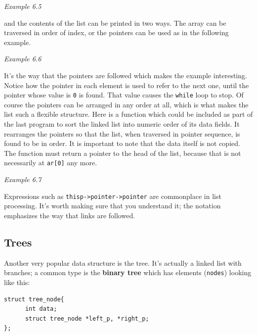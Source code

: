    \begin{center}\textit{Example 6.5}\end{center}


   and the contents of the list can be printed in two ways. The array can be
    traversed in order of index, or the pointers can be used as in the
    following example.


   \begin{center}\textit{Example 6.6}\end{center}


   It's the way that the pointers are followed which makes the example
    interesting. Notice how the pointer in each element is used to refer to the
    next one, until the pointer whose value is \texttt{0} is found. That
    value causes the \texttt{while} loop to stop. Of course the pointers
    can be arranged in any order at all, which is what makes the list such
    a flexible structure. Here is a function which could be included as part of
    the last program to sort the linked list into numeric order of its data
    fields. It rearranges the pointers so that the list, when traversed in
    pointer sequence, is found to be in order. It is important to note that the
    data itself is not copied. The function must return a pointer to the head
    of the list, because that is not necessarily at \texttt{ar[0]} any
    more.


   \begin{center}\textit{Example 6.7}\end{center}


   Expressions such as \texttt{thisp->pointer->pointer} are
    commonplace in list processing. It's worth making sure that you understand
    it; the notation emphasizes the way that links are followed.


  

  \subsection{Trees}
   

   Another very popular data structure is the tree. It's actually a linked
    list with branches; a common type is the \textbf{binary tree} which has
    elements (\texttt{nodes}) looking like this:


   \begin{Verbatim}
struct tree_node{
      int data;
      struct tree_node *left_p, *right_p;
};
\end{Verbatim}


